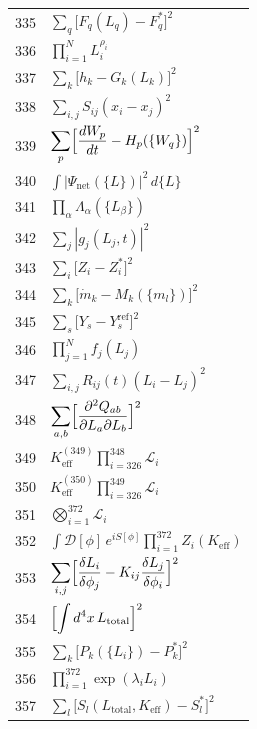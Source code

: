 \documentclass[11pt,a4paper]{article}
\begin{document}
\begin{longtable}{r p{}}
	335 & \(\displaystyle \sum_q\bigl[F_q(L_q) - F_q^*\bigr]^2\) \\
	336 & \(\displaystyle \prod_{i=1}^N L_i^{\rho_i}\) \\
	337 & \(\displaystyle \sum_k\bigl[h_k - G_k(L_k)\bigr]^2\) \\
	338 & \(\displaystyle \sum_{i,j}S_{ij}(x_i - x_j)^2\) \\
	339 & \(\displaystyle \sum_p\Bigl[\frac{dW_p}{dt} - H_p(\{W_q\})\Bigr]^2\) \\
	340 & \(\displaystyle \int|\Psi_{\text{net}}(\{L\})|^2\,d\{L\}\) \\
	341 & \(\displaystyle \prod_\alpha\Lambda_\alpha(\{L_\beta\})\) \\
	342 & \(\displaystyle \sum_j|g_j(L_j,t)|^2\) \\
	343 & \(\displaystyle \sum_i\bigl[Z_i - Z_i^*\bigr]^2\) \\
	344 & \(\displaystyle \sum_k\bigl[\dot m_k - M_k(\{m_l\})\bigr]^2\) \\
	345 & \(\displaystyle \sum_s\bigl[Y_s - Y_s^{\text{ref}}\bigr]^2\) \\
	346 & \(\displaystyle \prod_{j=1}^N f_j(L_j)\) \\
	347 & \(\displaystyle \sum_{i,j}R_{ij}(t)(L_i - L_j)^2\) \\
	348 & \(\displaystyle \sum_{a,b}\Bigl[\frac{\partial^2 Q_{ab}}{\partial L_a\partial L_b}\Bigr]^2\) \\
	349 & \(\displaystyle K^{(349)}_{\mathrm{eff}}\prod_{i=326}^{348}\mathcal{L}_i\) \\
	350 & \(\displaystyle K^{(350)}_{\mathrm{eff}}\prod_{i=326}^{349}\mathcal{L}_i\) \\
	351 & \(\displaystyle \bigotimes_{i=1}^{372}\mathcal{L}_i\) \\
	352 & \(\displaystyle \int\mathcal{D}[\phi]\,e^{iS[\phi]}\prod_{i=1}^{372}Z_i(K_{\mathrm{eff}})\) \\
	353 & \(\displaystyle \sum_{i,j}\Bigl[\frac{\delta L_i}{\delta\phi_j} - K_{ij}\frac{\delta L_j}{\delta\phi_i}\Bigr]^2\) \\
	354 & \(\displaystyle \Bigl[\int d^4x\,L_{\text{total}}\Bigr]^2\) \\
	355 & \(\displaystyle \sum_k\bigl[P_k(\{L_i\}) - P_k^*\bigr]^2\) \\
	356 & \(\displaystyle \prod_{i=1}^{372}\exp(\lambda_i L_i)\) \\
	357 & \(\displaystyle \sum_l\bigl[S_l(L_{\text{total}},K_{\mathrm{eff}}) - S_l^*\bigr]^2\) \\

\end{longtable}
\end{document}
